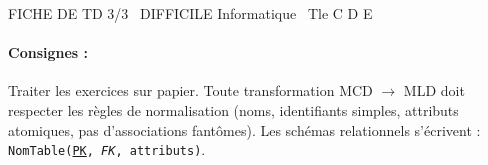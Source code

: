 \documentclass[11pt]{article}
\begin{document}
\pagestyle{empty}
\linespread{1.1}\selectfont

\begin{tcolorbox}[enhanced,colback=popink,colframe=popink,arc=10pt,boxrule=0pt,left=12pt,right=12pt,top=9pt,bottom=9pt]
{\color{white}\popxbold\small FICHE DE TD 3/3 \textbullet\ DIFFICILE \hfill Informatique \textbullet\ Tle C D E\par}
\end{tcolorbox}
\vspace{4pt}

\newcommand{\pk}[1]{\underline{#1}}
\newcommand{\fk}[1]{\textit{#1}}
\paragraph{Consignes :} Traiter les exercices sur papier. Toute transformation MCD $\to$ MLD doit respecter les règles de normalisation (noms, identifiants simples, attributs atomiques, pas d'associations fantômes). Les schémas relationnels s'écrivent : \texttt{NomTable(\pk{PK}, \fk{FK}, attributs)}.
\end{document}
